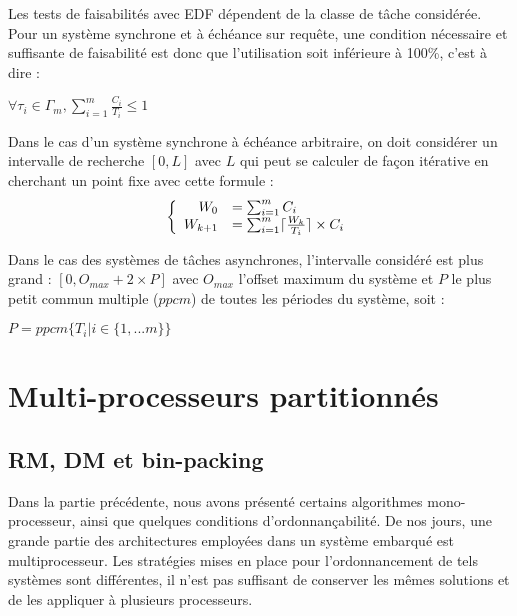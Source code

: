 \documentclass[11pt,a4paper,oneside]{report}
\begin{document}
Les tests de faisabilités avec EDF dépendent de la classe de tâche considérée. 
Pour un système synchrone et à échéance sur requête, 
une condition nécessaire et suffisante de faisabilité est donc que l'utilisation soit inférieure 
à 100\%, c'est à dire : \\
\begin{center}
	$\forall \tau_i \in \Gamma_m, \sum_{i=1}^{m}\frac{C_i}{T_i} \leq 1 $
\end{center}

Dans le cas d'un système synchrone à échéance arbitraire, on doit considérer un intervalle de 
recherche $[0, L]$ avec $L$ qui peut se calculer de façon itérative en cherchant un point fixe 
avec cette formule : \\
\[
\left \{
\begin{array}{r l}
W_0 &= \sum_{i = 1}^{m}C_i\\
W_{k+1} & =\sum_{i = 1}^{m} \lceil \frac{W_k}{T_i} \rceil \times C_i
\end{array}
\right.
\]

Dans le cas des systèmes de tâches asynchrones, l'intervalle considéré est plus grand : 
$[0, O_{max} + 2 \times P]$ avec $O_{max}$ l'offset maximum du système et 
$P$ le plus petit commun multiple ($ppcm$) de toutes les périodes du système, soit : \\
\begin{center}
	$P = ppcm\{T_i | i \in \{1, ... m\}\}$
\end{center}

\section{Multi-processeurs partitionnés}
\subsection{RM, DM et bin-packing}
Dans la partie précédente, nous avons présenté certains algorithmes mono-processeur, 
ainsi que quelques conditions d'ordonnançabilité.
De nos jours, une grande partie des architectures employées dans un système embarqué 
est multiprocesseur. Les stratégies mises en place pour l'ordonnancement de tels 
systèmes sont différentes, il n'est pas suffisant de conserver les mêmes solutions 
et de les appliquer à plusieurs processeurs.\\
 
\end{document}

